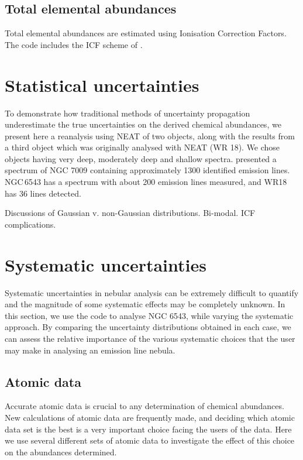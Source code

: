 \documentclass[useAMS,usenatbib]{mn2e}
\begin{document}
\subsection{Total elemental abundances}

Total elemental abundances are estimated using Ionisation Correction Factors.  The code includes the ICF scheme of \citet{1994MNRAS.271..257K}.

\section{Statistical uncertainties}

To demonstrate how traditional methods of uncertainty propagation underestimate the true uncertainties on the derived chemical abundances, we present here a reanalysis using NEAT of two objects, along with the results from a third object which was originally analysed with NEAT (WR 18).  We chose objects having very deep, moderately deep and shallow spectra.  \citet{2011MNRAS.415..181F} presented a spectrum of NGC 7009 containing approximately 1300 identified emission lines.  NGC\,6543 \citep{2004MNRAS.351.1026W} has a spectrum with about 200 emission lines measured, and WR18 \citep{2011arXiv1108.3800S} has 36 lines detected.

Discussions of Gaussian v. non-Gaussian distributions.  Bi-modal.  ICF complications.

\section{Systematic uncertainties}

Systematic uncertainties in nebular analysis can be extremely difficult to quantify and the magnitude of some systematic effects may be completely unknown.  In this section, we use the code to analyse NGC 6543, while varying the systematic approach.  By comparing the uncertainty distributions obtained in each case, we can assess the relative importance of the various systematic choices that the user may make in analysing an emission line nebula.

\subsection{Atomic data}

Accurate atomic data is crucial to any determination of chemical abundances.  New calculations of atomic data are frequently made, and deciding which atomic data set is the best is a very important choice facing the users of the data.  Here we use several different sets of atomic data to investigate the effect of this choice on the abundances determined.
\end{document}
